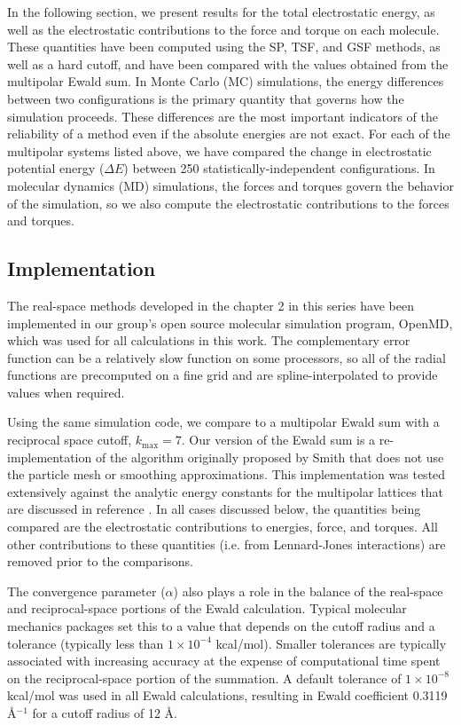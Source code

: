 In the following section, we present results for the total
electrostatic energy, as well as the electrostatic contributions to
the force and torque on each molecule.  These quantities have been
computed using the SP, TSF, and GSF methods, as well as a hard cutoff,
and have been compared with the values obtained from the multipolar
Ewald sum.  In Monte Carlo (MC) simulations, the energy differences
between two configurations is the primary quantity that governs how
the simulation proceeds. These differences are the most important
indicators of the reliability of a method even if the absolute
energies are not exact.  For each of the multipolar systems listed
above, we have compared the change in electrostatic potential energy
($\Delta E$) between 250 statistically-independent configurations.  In
molecular dynamics (MD) simulations, the forces and torques govern the
behavior of the simulation, so we also compute the electrostatic
contributions to the forces and torques.

\subsection{Implementation}
The real-space methods developed in the chapter 2 in this series
have been implemented in our group's open source molecular simulation
program, OpenMD,\cite{openmd2.3} which was used for all calculations in
this work.  The complementary error function can be a relatively slow
function on some processors, so all of the radial functions are
precomputed on a fine grid and are spline-interpolated to provide
values when required.  

Using the same simulation code, we compare to a multipolar Ewald sum
with a reciprocal space cutoff, $k_\mathrm{max} = 7$.  Our version of
the Ewald sum is a re-implementation of the algorithm originally
proposed by Smith that does not use the particle mesh or smoothing
approximations.\cite{Smith82,Smith98} This implementation was tested
extensively against the analytic energy constants for the multipolar
lattices that are discussed in reference \cite{PaperI}.  In all
cases discussed below, the quantities being compared are the
electrostatic contributions to energies, force, and torques.  All
other contributions to these quantities (i.e. from Lennard-Jones
interactions) are removed prior to the comparisons.

The convergence parameter ($\alpha$) also plays a role in the balance
of the real-space and reciprocal-space portions of the Ewald
calculation.  Typical molecular mechanics packages set this to a value
that depends on the cutoff radius and a tolerance (typically less than
$1 \times 10^{-4}$ kcal/mol).  Smaller tolerances are typically
associated with increasing accuracy at the expense of computational
time spent on the reciprocal-space portion of the
summation.\cite{Perram88,Essmann95} A default tolerance of $1 \times
10^{-8}$ kcal/mol was used in all Ewald calculations, resulting in
Ewald coefficient 0.3119 \AA$^{-1}$ for a cutoff radius of 12 \AA.

